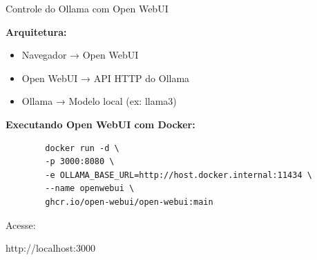 \documentclass{beamer}
\begin{document}
\begin{frame}[fragile]{Controle do Ollama com Open WebUI}
    
    \textbf{Arquitetura:}
    \begin{itemize}
        \item Navegador → Open WebUI
        \item Open WebUI → API HTTP do Ollama
        \item Ollama → Modelo local (ex: llama3)
    \end{itemize}
    
    \vspace{0.3cm}
    
    \textbf{Executando Open WebUI com Docker:}
    
    \begin{verbatim}
        docker run -d \
        -p 3000:8080 \
        -e OLLAMA_BASE_URL=http://host.docker.internal:11434 \
        --name openwebui \
        ghcr.io/open-webui/open-webui:main
    \end{verbatim}
    
    \vspace{0.3cm}
    
    Acesse:
    \begin{center}
        http://localhost:3000
    \end{center}
    
\end{frame}
\end{document}
